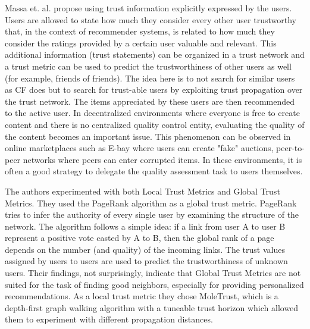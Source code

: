 



Massa et. al. \cite{Massa2004, Massa2007} propose using trust information
explicitly expressed by the users. Users are allowed to state how much they
consider every other user trustworthy that, in the context of recommender
systems, is related to how much they consider the ratings provided by a certain
user valuable and relevant. This additional information (trust statements) can
be organized in a trust network and a trust metric can be used to predict the
trustworthiness of other users as well (for example, friends of friends). The
idea here is to not search for similar users as CF does but to search for
trust-able users by exploiting trust propagation over the trust network. The
items appreciated by these users are then recommended to the active user. In
decentralized environments where everyone is free to create content and there
is no centralized quality control entity, evaluating the quality of the content
becomes an important issue. This phenomenon can be observed in online
marketplaces such as E-bay where users can create "fake" auctions, peer-to-peer
networks where peers can enter corrupted items. In these environments, it is
often a good strategy to delegate the quality assessment task to users
themselves.

The authors experimented with both Local Trust Metrics and Global Trust
Metrics. They used the PageRank algorithm as a global trust metric. PageRank
tries to infer the authority of every single user by examining the structure of
the network. The algorithm follows a simple idea: if a link from user A to user
B represent a positive vote casted by A to B, then the global rank of a page
depends on the number (and quality) of the incoming links. The trust values
assigned by users to users are used to predict the trustworthiness of unknown
users. Their findings, not surprisingly, indicate that Global Trust Metrics are
not suited for the task of finding good neighbors, especially for providing
personalized recommendations. As a local trust metric they chose MoleTrust,
which is a depth-first graph walking algorithm with a tuneable trust horizon
which allowed them to experiment with different propagation distances.

